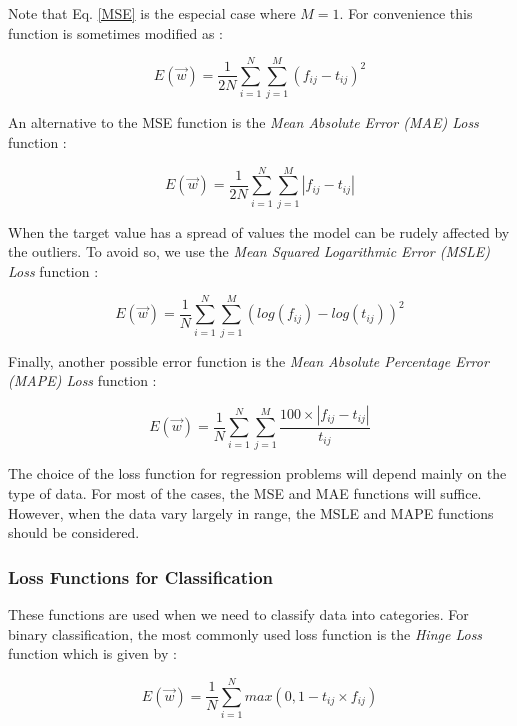 Note that Eq. \ref{MSE} is the especial case where $M=1$. For convenience this function is sometimes modified as \cite{deep_learning}:

\begin{equation}
	E(\vec{w})=\frac{1}{2N} \sum_{i =1}^{N} \sum_{j =1}^{M} (f_{ij}-t_{ij})^{2}
\end{equation}

An alternative to the MSE function is the \textit{Mean Absolute Error (MAE) Loss} function \cite{deep_learning}:

\begin{equation}
	E(\vec{w})=\frac{1}{2N} \sum_{i =1}^{N} \sum_{j =1}^{M} |f_{ij}-t_{ij}|
\end{equation}

When the target value has a spread of values the model can be rudely affected by the outliers. To avoid so, we use the \textit{Mean Squared Logarithmic Error (MSLE) Loss} function \cite{deep_learning} \cite{choose_fun_online}:

\begin{equation}
	E(\vec{w})=\frac{1}{N} \sum_{i =1}^{N} \sum_{j =1}^{M} (log(f_{ij})-log(t_{ij}))^{2}
\end{equation}

Finally, another possible error function is the \textit{Mean Absolute Percentage Error (MAPE) Loss} function \cite{deep_learning}:

\begin{equation}
	E(\vec{w})=\frac{1}{N} \sum_{i =1}^{N} \sum_{j =1}^{M} \frac{100 \times |f_{ij}-t_{ij}| }{t_{ij}}
\end{equation}

The choice of the loss function for regression problems will depend mainly on the type of data. For most of the cases, the MSE and MAE functions will suffice. However, when the data vary largely in range, the MSLE and MAPE functions should be considered.

\subsubsection*{Loss Functions for Classification}
These functions are used when we need to classify data into categories. For binary classification, the most commonly used loss function is the \textit{Hinge Loss} function which is given by \cite{deep_learning}:

\begin{equation}
	E(\vec{w})=\frac{1}{N} \sum_{i =1}^{N} max(0,1-t_{ij} \times f_{ij} )
\end{equation}

